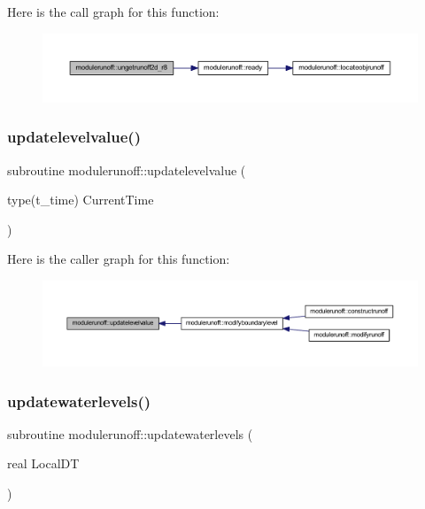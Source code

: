 Here is the call graph for this function\+:
\nopagebreak
\begin{figure}[H]
\begin{center}
\leavevmode
\includegraphics[width=350pt]{namespacemodulerunoff_af00779fc9a81a3cdf2947f1c7990d1c8_cgraph}
\end{center}
\end{figure}
\mbox{\label{namespacemodulerunoff_a420154ccf7d67c95702222f4b56fb5fa}} 
\subsubsection{\texorpdfstring{updatelevelvalue()}{updatelevelvalue()}}
{\footnotesize\ttfamily subroutine modulerunoff\+::updatelevelvalue (\begin{DoxyParamCaption}\item[{type(t\+\_\+time)}]{Current\+Time }\end{DoxyParamCaption})\hspace{0.3cm}{\ttfamily [private]}}

Here is the caller graph for this function\+:
\nopagebreak
\begin{figure}[H]
\begin{center}
\leavevmode
\includegraphics[width=350pt]{namespacemodulerunoff_a420154ccf7d67c95702222f4b56fb5fa_icgraph}
\end{center}
\end{figure}
\mbox{\label{namespacemodulerunoff_ae21623961ce63cf7c148437e7ad9d934}} 
\subsubsection{\texorpdfstring{updatewaterlevels()}{updatewaterlevels()}}
{\footnotesize\ttfamily subroutine modulerunoff\+::updatewaterlevels (\begin{DoxyParamCaption}\item[{real}]{Local\+DT }\end{DoxyParamCaption})\hspace{0.3cm}{\ttfamily [private]}}


